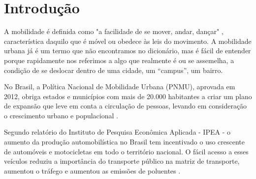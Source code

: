 %
%

\chapter{Introdução}\label{chap:introducao}  



A mobilidade é definida como "a facilidade de se mover, andar, dançar"  \cite{mobilidade}, característica daquilo que é móvel ou obedece às leis do movimento. A mobilidade urbana já é um termo que não encontramos no dicionário, mas é fácil de entender porque rapidamente nos referimos a algo que realmente é ou se assemelha, a condição de se deslocar dentro de uma cidade, um “campus”, um bairro.

No Brasil, a Política Nacional de Mobilidade Urbana (PNMU), aprovada em 2012, obriga estados e municípios com mais de 20.000 habitantes a criar um plano de expansão que leve em conta a circulação de pessoas, levando em consideração o crescimento urbano e populacional \cite{lei12587}.

Segundo relatório do Instituto de Pesquisa Econômica Aplicada - IPEA - o aumento da produção automobilística no Brasil tem incentivado o uso crescente de automóveis e motocicletas em todo o território nacional. O fácil acesso a esses veículos reduziu a importância do transporte público na matriz de transporte, aumentou o tráfego e aumentou as emissões de poluentes \cite{ipea}.
 
